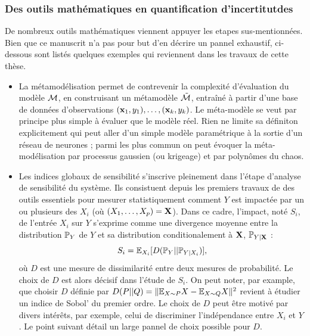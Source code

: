 \subsubsection{Des outils mathématiques en quantification d'incertitutdes}

De nombreux outils mathématiques viennent appuyer les etapes sus-mentionnées. Bien que ce manuscrit n'a pas pour but d'en décrire un pannel exhaustif, ci-dessous sont listés quelques exemples qui reviennent dans les travaux de cette thèse.

\begin{itemize}
    \item La métamodélisation %
    permet de contrevenir la complexité d'évaluation du modèle $\mathcal{M}$, en construisant un métamodèle $\tilde{\mathcal{M}}$, entraîné à partir d'une base de données d'observations $(\mathbf{x}_1, y_1),\dots,(\mathbf{x}_k,y_k)$. Le méta-modèle se veut par principe plus simple à évaluer que le modèle réel. 
    Rien ne limite sa définiton explicitement qui peut aller d'un simple modèle paramétrique à la sortie d'un réseau de neurones ; parmi les plus commun on peut évoquer la méta-modélisation par processus gaussien (ou krigeage) et par polynômes du chaos.
    \item Les indices globaux de sensibilité s'inscrive pleinement dans l'étape d'analyse de sensibilité du système. Ils consistuent depuis les premiers travaux de \citet{sobol_sensitivity_1993} des outils essentiels pour mesurer statistiquement comment $ Y$ est impactée par un ou plusieurs des $X_i$ (où $(X_1,\dots,X_p)=\mathbf{X}$). Dans ce cadre, l'impact, noté $S_i$, de l'entrée $X_i$ sur $ Y$ s'exprime comme une divergence moyenne entre la distribution $\mathbb{P}_{ Y}$ de $ Y$ et sa distribution conditionalement à $\mathbf{X}$, $\mathbb{P}_{Y|\mathbf{X}}$ \citep{da_veiga_global_2015} : 
        \begin{equation}
            S_i = \mathbb{E}_{X_i}[D(\mathbb{P}_{ Y}||\mathbb{P}_{Y|X_i})],
        \end{equation}
    où $D$ est une mesure de dissimilarité entre deux mesures de probabilité.
    Le choix de $D$ est alors décisif dans l'étude de $S_i$. %
    On peut noter, par example, que choisir $D$ définie par $D(P||Q) = \|\mathbb{E}_{X\sim P}X-\mathbb{E}_{X\sim Q}X\|^2$ revient à étudier un indice de Sobol' du premier ordre.
    Le choix de $D$ peut être motivé par divers intérêts, par exemple, celui de discriminer  l'indépendance entre $X_i$ et $ Y$. Le point suivant détail un large pannel de choix possible pour $D$.


\end{itemize}
